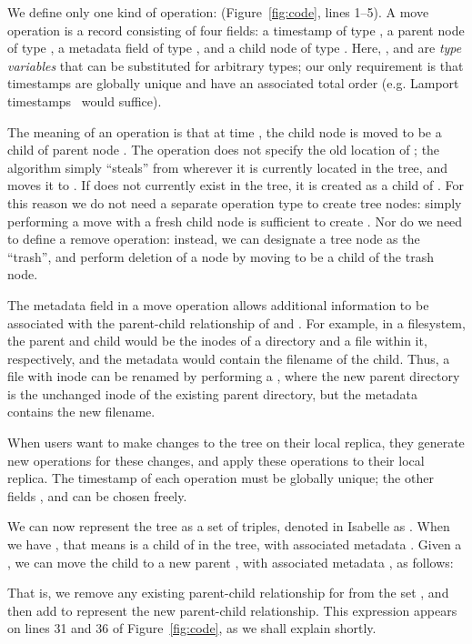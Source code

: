 \documentclass[sigplan,anonymous]{acmart}
\begin{document}
We define only one kind of operation:  (Figure~\ref{fig:code}, lines 1--5).
A move operation is a record consisting of four fields: a timestamp  of type , a parent node  of type , a metadata field  of type , and a child node  of type .
Here, ,  and  are \emph{type variables} that can be substituted for arbitrary types; our only requirement is that timestamps  are globally unique and have an associated total order (e.g. Lamport timestamps~\cite{Lamport:1978jq} would suffice).

The meaning of an operation  is that at time , the child node  is moved to be a child of parent node .
The operation does not specify the old location of ; the algorithm simply ``steals''  from wherever it is currently located in the tree, and moves it to .
If  does not currently exist in the tree, it is created as a child of .
For this reason we do not need a separate operation type to create tree nodes: simply performing a move with a fresh child node  is sufficient to create .
Nor do we need to define a remove operation: instead, we can designate a tree node as the ``trash'', and perform deletion of a node  by moving  to be a child of the trash node.

The metadata field  in a move operation allows additional information to be associated with the parent-child relationship of  and .
For example, in a filesystem, the parent and child would be the inodes of a directory and a file within it, respectively, and the metadata would contain the filename of the child.
Thus, a file with inode  can be renamed by performing a , where the new parent directory  is the unchanged inode of the existing parent directory, but the metadata  contains the new filename.

When users want to make changes to the tree on their local replica, they generate new  operations for these changes, and apply these operations to their local replica.
The timestamp  of each operation must be globally unique; the other fields ,  and  can be chosen freely.

We can now represent the tree as a set of  triples, denoted in Isabelle as .
When we have , that means  is a child of  in the tree, with associated metadata .
Given a , we can move the child  to a new parent , with associated metadata , as follows:
\begin{quote}
\end{quote}
That is, we remove any existing parent-child relationship for  from the set , and then add  to represent the new parent-child relationship.
This expression appears on lines 31 and 36 of Figure~\ref{fig:code}, as we shall explain shortly.
\end{document}
